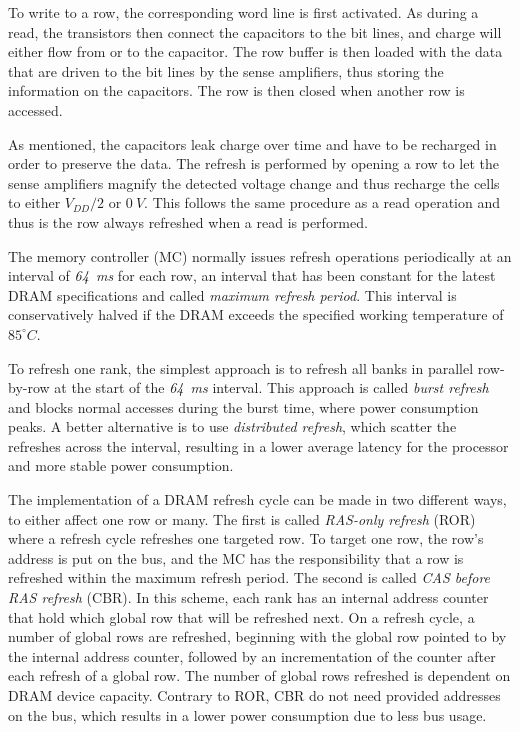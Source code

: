 To write to a row, the corresponding word line is first activated. As during a read, the transistors then connect the capacitors to the bit lines, and charge will either flow from or to the capacitor. The row buffer is then loaded with the data that are driven to the bit lines by the sense amplifiers, thus storing the information on the capacitors. The row is then closed when another row is accessed.

As mentioned, the capacitors leak charge over time and have to be recharged in order to preserve the data. The refresh is performed by opening a row to let the sense amplifiers magnify the detected voltage change and thus recharge the cells to either $V_{DD}/2$ or $0\:V$. This follows the same procedure as a read operation and thus is the row always refreshed when a read is performed. %

The memory controller (MC) normally issues refresh operations periodically at an interval of \textit{64~ms} for each row, an interval that has been constant for the latest DRAM specifications \cite{ddr}\cite{ddr2}\cite{ddr3} and called \textit{maximum refresh period}. This interval is conservatively halved if the DRAM exceeds the specified working temperature of $85^{\circ}C$. 

To refresh one rank, the simplest approach is to refresh all banks in parallel row-by-row at the start of the \textit{64~ms} interval. This approach is called \textit{burst refresh} and blocks normal accesses during the burst time, where power consumption peaks. A better alternative is to use \textit{distributed refresh}, which scatter the refreshes across the interval, resulting in a lower average latency for the processor and more stable power consumption.

The implementation of a DRAM refresh cycle can be made in two different ways, to either affect one row or many. The first is called \textit{RAS-only refresh} (ROR) where a refresh cycle refreshes one targeted row. To target one row, the row's address is put on the bus, and the MC has the responsibility that a row is refreshed within the maximum refresh period. The second is called \textit{CAS before RAS refresh} (CBR). In this scheme, each rank has an internal address counter that hold which global row that will be refreshed next. On a refresh cycle, a number of global rows are refreshed, beginning with the global row pointed to by the internal address counter, followed by an incrementation of the counter after each refresh of a global row. The number of global rows refreshed is dependent on DRAM device capacity. Contrary to ROR, CBR do not need provided addresses on the bus, which results in a lower power consumption due to less bus usage. 


